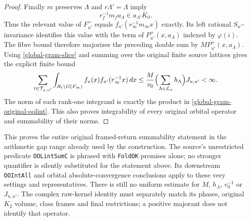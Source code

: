 \begin{proof}
Finally $m$ preserves $\Lambda$ and $r\Lambda'=\Lambda$ imply
\[
                   r_f^{-1}m_fa_\Lambda\in a_{\Lambda'}K_0.
\]
Thus the relevant value of $F_{u'}^+$ equals
$f_{u'}(r_\infty^{-1}m_\infty x)$ exactly.
Its left rational $S_{u'}$-invariance identifies this value with
the term of $P_{u'}^+(x,a_\Lambda)$ indexed by $\varphi(i)$.
The fibre bound therefore majorizes the preceding double sum
by $M P_{u'}^+(x,a_\Lambda)$.
Using \eqref{global-gram-slice} and summing over the original
finite source lattices gives the explicit finite bound
\begin{equation}\label{global-gram-finite-ool-bound}
 \sum_{t\in\mathcal T_{u,u'}}\int_{R_t\backslash G(F_\infty)}
                       f_u(x)f_{u'}(r_\infty^{-1}x)\,dx
 \le {M\over v_0}\Bigl(\sum_{\Lambda\in\mathcal L_u}h_\Lambda\Bigr)
                                                       J_{u,u'}<\infty.
\end{equation}
The norm of each rank-one integrand is exactly the product in
\eqref{global-gram-original-oolint}.  This also proves integrability
of every original orbital operator and summability of their norms.
\end{proof}

This proves the entire original framed-return summability statement
in the arithmetic gap range already used by the construction.
The source's unrestricted predicate \texttt{OOLintSumC} is phrased
with \texttt{FoldOK} premises alone; no stronger quantifier is
silently substituted for the statement above.  Its downstream
\texttt{OOIntAll} and orbital absolute-convergence conclusions apply
to these very settings and representatives.  There is still no
uniform estimate for $M$, $h_\Lambda$, $v_0^{-1}$ or $J_{u,u'}$.
The complex raw-kernel identity must separately match its phases,
original $K_2$ volume, class frames and final restrictions; a
positive majorant does not identify that operator.
